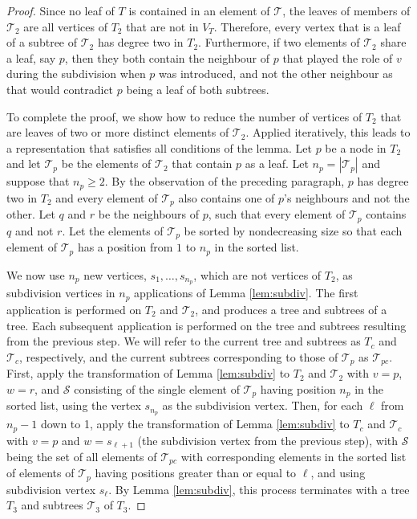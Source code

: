 \documentclass[
final
]{dmtcs-episciences}        \usepackage{graphics, amsthm, amsmath, amssymb, algorithm, algorithmic}
\begin{document}
\begin{proof}
Since no leaf of $T$ is contained in an element of $\mathcal{T}$,
the leaves of members of $ \mathcal{T}_2 $
are all vertices of $T_2$ that are not in $V_T$.
Therefore, every vertex that is a leaf of a subtree of 
$ \mathcal{T}_2 $ has degree two in $T_2$.
Furthermore, if two elements of $ \mathcal{T}_2 $ share a leaf, say $p$, then they both contain the neighbour of $p$ that played the role of $v$ during the subdivision when $p$ was introduced, and not the other neighbour as that would contradict $p$ being a leaf of both subtrees.

To complete the proof, we show how to 
reduce the number of vertices of $T_2$ that are leaves of two or more distinct elements of $\mathcal{T}_2$. Applied iteratively, this leads to a representation that satisfies all conditions of the lemma.
Let $p$ be a node in $T_2$
and let $\mathcal{T}_p$ be the elements of $\mathcal{T}_2 $ that contain $p$ as a leaf.
Let $n_p = |\mathcal{T}_p|$ and suppose that $n_p \ge 2$.
By the observation of the preceding paragraph, $p$ has degree two in $T_2$
and every element of $\mathcal{T}_p $ also contains one of $p$'s neighbours and not the other.
Let $q$ and $r$ be the neighbours of $p$, such that every element of $\mathcal{T}_p $ contains $q$ and not $r$.
Let the elements of $\mathcal{T}_p$ be
sorted by nondecreasing size so that each element of $\mathcal{T}_p$ has a position from $1$ to $n_p$ in the sorted list.

We now use $n_p$ new vertices, $s_1, \ldots, s_{n_p}$, which are not vertices of $T_2$, as subdivision vertices in $n_p$ applications of Lemma \ref{lem:subdiv}.
The first application is performed on $T_2$ and $\mathcal T_2$, and produces a tree and subtrees of a tree. Each subsequent application is performed on the tree and subtrees resulting from the previous step. We will refer to the current tree and subtrees as $T_c$ and $\mathcal T_c$, respectively, and the current subtrees corresponding to those of $\mathcal T_p$ as $\mathcal T_{pc}$.
First, apply the transformation of Lemma \ref{lem:subdiv} to $T_2$ and $\mathcal T_2$ with $v=p$, $w=r$, and $\mathcal S$ consisting of the single element of $\mathcal T_p$ having position $n_p$ in the sorted list, using the vertex $s_{n_p}$ as the subdivision vertex.
Then, for each $\ell$ from $n_p-1$ down to 1, apply the transformation of Lemma \ref{lem:subdiv} to $T_c$ and $\mathcal T_c$ with $v=p$ and $w=s_{\ell+1}$ (the subdivision vertex from the previous step), with $\mathcal S$ being the set of all elements of $\mathcal T_{pc}$ with corresponding elements in the sorted list of elements of $\mathcal T_p$ having positions greater than or equal to $\ell$, and using subdivision vertex $s_{\ell}$.
By Lemma \ref{lem:subdiv}, this process terminates with a tree $T_3$ and subtrees $\mathcal T_3$ of $T_3$.


\end{proof}
\end{document}

